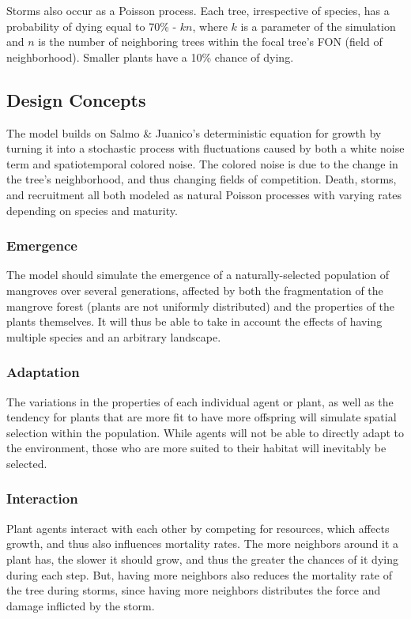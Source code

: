 Storms also occur as a Poisson process. Each tree, irrespective of species, has a probability of dying equal to 70\% - $kn$, where $k$ is a parameter of the simulation and $n$ is the number of neighboring trees within the focal tree's FON (field of neighborhood). Smaller plants have a 10\% chance of dying.

\subsection{Design Concepts}
The model builds on Salmo \& Juanico's deterministic equation for growth by turning it into a stochastic process with fluctuations caused by both a white noise term and spatiotemporal colored noise. The colored noise is due to the change in the tree's neighborhood, and thus changing fields of competition. Death, storms, and recruitment all both modeled as natural Poisson processes with varying rates depending on species and maturity.

\subsubsection{Emergence}
The model should simulate the emergence of a naturally-selected population of mangroves over several generations, affected by both the fragmentation of the mangrove forest (plants are not uniformly distributed) and the properties of the plants themselves. It will thus be able to take in account the effects of having multiple species and an arbitrary landscape.

\subsubsection{Adaptation}
The variations in the properties of each individual agent or plant, as well as the tendency for plants that are more fit to have more offspring will simulate spatial selection within the population. While agents will not be able to directly adapt to the environment, those who are more suited to their habitat will inevitably be selected.

\subsubsection{Interaction}
Plant agents interact with each other by competing for resources, which affects growth, and thus also influences mortality rates. The more neighbors around it a plant has, the slower it should grow, and thus the greater the chances of it dying during each step. But, having more neighbors also reduces the mortality rate of the tree during storms, since having more neighbors distributes the force and damage inflicted by the storm.

